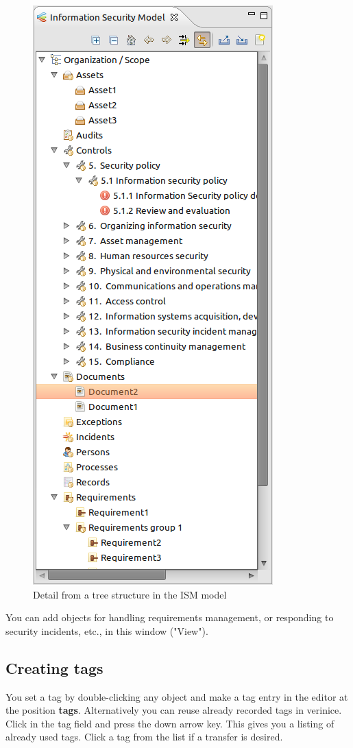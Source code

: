 \documentclass[a4paper,10pt]{book}
\begin{document}
\begin{figure}[htb!]
  \centering
  \includegraphics[scale=.5]{Screenshot/Baumstruktur_ISM-en.png}
  \caption{\label{Detail from a tree structure in the ISM model} Detail from a tree structure in the ISM model}
\end{figure}
You can add objects for handling requirements management, or responding to
security incidents, etc., in this window ("View").

\subsection{Creating tags}
You set a tag by double-clicking any object and make a tag entry in the editor at the position \textbf{tags}.
Alternatively you can reuse already recorded tags in verinice.
Click in the tag field and press the down arrow key. This gives you a listing of already used tags. Click a tag from the list if a transfer is desired.
\end{document}

